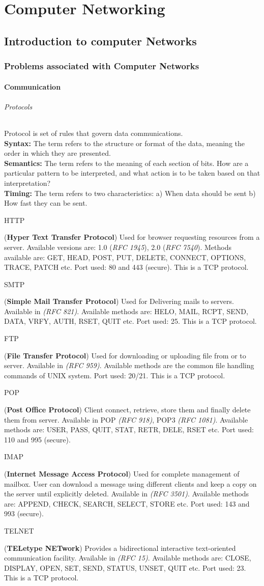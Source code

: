 \part{Computer Networking}
\chapter{Introduction to computer Networks}
\section{Problems associated with Computer Networks}
\subsection{Communication}
\paragraph{Protocols}
Protocol is set of rules that govern data communications.\\
\indent \textbf{Syntax:} The term refers to the structure or format of the data, meaning the order in which they are presented.\\
\indent \textbf{Semantics:} The term refers to the meaning of each section of bits. How are a particular pattern to be interpreted, and what action is to be taken based on that interpretation?\\
\indent \textbf{Timing:} The term refers to two characteristics: a) When data should be sent b) How fast they can be sent.
\subparagraph{HTTP} (\textbf{Hyper Text Transfer Protocol}) Used for browser requesting resources from a server. Available versions are: 1.0 (\textit{RFC 1945}), 2.0 (\textit{RFC 7540}). Methods available are: GET, HEAD, POST, PUT, DELETE, CONNECT, OPTIONS, TRACE, PATCH etc. Port used: 80 and 443 (secure). This is a TCP protocol.
\subparagraph{SMTP} (\textbf{Simple Mail Transfer Protocol}) Used for Delivering mails to servers. Available in \textit{(RFC 821)}. Available methods are: HELO, MAIL, RCPT, SEND, DATA, VRFY, AUTH, RSET, QUIT etc. Port used: 25. This is a TCP protocol.
\subparagraph{FTP} (\textbf{File Transfer Protocol}) Used for downloading or uploading file from or to server. Available in \textit{(RFC 959)}. Available methods are the common file handling commands of UNIX system. Port used: 20/21. This is a TCP protocol.
\subparagraph{POP} (\textbf{Post Office Protocol}) Client connect, retrieve, store them and finally delete them from server. Available in POP \textit{(RFC 918)}, POP3 \textit{(RFC 1081)}. Available methods are: USER, PASS, QUIT, STAT, RETR, DELE, RSET etc. Port used: 110 and 995 (secure).
\subparagraph{IMAP} (\textbf{Internet Message Access Protocol}) Used for complete management of mailbox. User can download a message using different clients and keep a copy on the server until explicitly deleted. Available in \textit{(RFC 3501)}. Available methods are: APPEND, CHECK, SEARCH, SELECT, STORE etc. Port used: 143 and 993 (secure).
\subparagraph{TELNET} (\textbf{TELetype NETwork}) Provides a bidirectional interactive text-oriented communication facility. Available in \textit{(RFC 15)}. Available methods are: CLOSE, DISPLAY, OPEN, SET, SEND, STATUS, UNSET, QUIT etc. Port used: 23. This is a TCP protocol.
